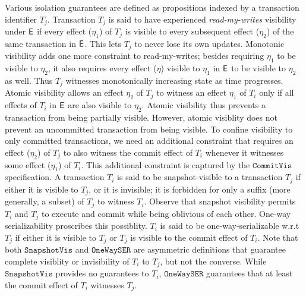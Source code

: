 Various isolation guarantees are defined as propositions indexed by
a transaction identifier $T_j$. Transaction $T_j$ is said to have
experienced \emph{read-my-writes} visibility under $\textsf{E}$ if every
effect ($\eta_1$) of $T_j$ is visible to every subsequent effect
($\eta_2$) of the same transaction in $\textsf{E}$. This lets $T_j$ to never
lose its own updates. Monotonic visibility adds one more constraint to
read-my-writes; besides requiring $\eta_1$ to be visible to $\eta_2$,
it also requires every effect ($\eta$) visible to $\eta_1$ in $\textsf{E}$ to
be visible to $\eta_2$ as well. Thus $T_j$ witnesses monotonically
increasing state as time progresses. Atomic visibility allows an
effect $\eta_2$ of $T_j$ to witness an effect $\eta_1$ of $T_i$ only
if all effects of $T_i$ in $\textsf{E}$ are also visible to $\eta_2$. Atomic
visibility thus prevents a transaction from being partially visible.
However, atomic visiblity does not prevent an uncommitted transaction
from being visible. To confine visibility to only committed
transactions, we need an additional constraint that requires an effect
($\eta_2$) of $T_j$ to also witness the commit effect of $T_i$
whenever it witnesses some effect ($\eta_1$) of $T_i$. This additional
constraint is captured by the $\mathtt{CommitVis}$ specification. A
transaction $T_i$ is said to be snapshot-visible to a transaction
$T_j$ if either it is visible to $T_j$, or it is invisible; it is
forbidden for only a suffix (more generally, a subset) of $T_j$ to
witness $T_i$. Observe that snapshot visibility permits $T_i$ and $T_j$ to
execute and commit while being  oblivious of each other. One-way
serializability proscribes this possiblity. $T_i$
is said to be one-way-serializable w.r.t $T_j$ if either it is visible
to $T_j$ or $T_j$ is visible to the commit effect of $T_i$.  Note that
both $\mathtt{SnapshotVis}$ and $\mathtt{OneWaySER}$ are asymmetric
definitions that guarantee complete visiblity or invisibility of $T_i$
to $T_j$, but not the converse. While $\mathtt{SnapshotVis}$ provides
no guarantees to $T_i$, $\mathtt{OneWaySER}$ guarantees that at least
the commit effect of $T_i$ witnesses $T_j$.

